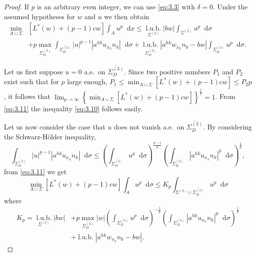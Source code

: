 \documentclass[a4paper,12pt,leqno]{article}
\numberwithin{equation}{section}
\newcommand{\dd}{\mathop{}\!\mathrm{d}}
\newcommand{\lub}[1]{\underset{#1}{\operatorname{l.u.b.}}}
\newcommand{\ovdir}{\overline{\Sigma_{D}^{(3)}}}
\begin{document}
\begin{proof}
	If $p$ is an arbitrary even integer, we can use \eqref{eq:3.3} with $\delta=0$.
	Under the assumed hypotheses for $w$ and $u$ we then obtain
	\begin{equation}
		\label{eq:3.11}
		\begin{split}
			\min_{A\cup\Sigma} & [L^*(w) + (p-1)cw] \int_A u^p \dd x \leq \underset{\Sigma^{(2)}}{\operatorname{l.u.b.}} |bw| \int_{\Sigma^{(2)}} u^p \dd \sigma \\
			& + p \max_{\overline{\Sigma^{(3)}_D}} \int_{\overline{\Sigma^{(3)}_D}} |u|^{p-1} |a^{hk} u_{x_h} n_k| \dd \sigma
			+ \underset{\overline{\Sigma^{(3)}_D}}{\operatorname{l.u.b.}} |a^{hk} w_{x_h} n_k - bw| \int_{\overline{\Sigma^{(3)}_D}} u^p \dd \sigma.
		\end{split}
	\end{equation}

	Let us first suppose $u=0$ a.e.\ on $\ovdir$. 
	Since two positive numbers $P_{1}$ and $P_{2}$ exist such that for $p$ large enough, $P_{1} \leq \min_{A\cup\Sigma} \left[L^{*}(w)+(p-1) c w\right] \leq P_{2} p$, it follows that $\lim_{p \rightarrow \infty}\left\{\min _{A \cup \Sigma}\left[L^{*}(w)+(p-1) c w\right]\right\}^{\frac{1}{p}}=1$.
	From \eqref{eq:3.11} the inequality
	\eqref{eq:3.10} follows easily.
	
	Let us now consider the case that $u$ does not vanish a.e.\ on $\ovdir$.
	By considering the Schwarz-Hölder inequality,
	\begin{equation*}
		\int_{\ovdir} |u|^{p-1} |a^{hk} u_{x_h} n_k| \dd \sigma 
		\leq \left(\int_{\ovdir} u^p \dd \sigma\right)^{\frac{p-1}{p}} \left(\int_{\ovdir} |a^{hk}u_{x_h} n_k|^p \dd \sigma\right)^{\frac 1 p},
	\end{equation*}
	from \eqref{eq:3.11} we get
	\begin{equation}
		\label{eq:3.12}
		\min_{A \cup \Sigma}\left[L^{*}(w)+(p-1) c w\right] \int_{A} u^{p} \dd \sigma \leq K_{p} \int_{\Sigma^{(2)} \cup \ovdir} u^{p} \dd \sigma
	\end{equation}
	where
	\begin{equation*}
		\begin{split}
			K_p = \lub{\Sigma^{(2)}} |bw| & + p \max_{\ovdir} |w| \left(\int_{\ovdir} u^p \dd \sigma\right)^{-\frac 1p} \left(\int_{\ovdir} |a^{hk} u_{x_h} n_k|^p \dd \sigma \right)^{\frac 1p}  \\
			& 			+ \lub{} |a^{hk} w_{x_h} n_k-bw|.
		\end{split}
	\end{equation*}


\end{proof}
\end{document}
